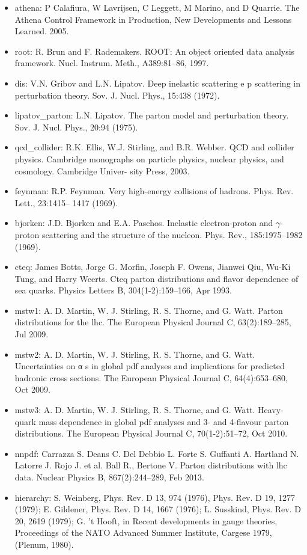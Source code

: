 \begin{itemize}
	\item athena: P Calafiura, W Lavrijsen, C Leggett, M Marino, and D Quarrie. The Athena 	Control Framework in Production, New Developments and Lessons Learned. 	2005.
	\item root: R. Brun and F. Rademakers. ROOT: An object oriented data analysis framework. Nucl. Instrum. Meth., A389:81–86, 1997.
	\item dis: V.N. Gribov and L.N. Lipatov. Deep inelastic scattering e p scattering in perturbation theory. Sov. J. Nucl. Phys., 15:438 (1972).
	\item lipatov\_parton: L.N. Lipatov. The parton model and perturbation theory. Sov. J. Nucl. Phys., 20:94
	(1975).
	\item qcd\_collider: R.K. Ellis, W.J. Stirling, and B.R. Webber. QCD and collider physics. Cambridge
	monographs on particle physics, nuclear physics, and cosmology. Cambridge Univer-
	sity Press, 2003.
	\item feynman: R.P. Feynman. Very high-energy collisions of hadrons. Phys. Rev. Lett., 23:1415–
	1417 (1969).
	\item bjorken: J.D. Bjorken and E.A. Paschos. Inelastic electron-proton and $\gamma$-proton scattering
	and the structure of the nucleon. Phys. Rev., 185:1975–1982 (1969).
	\item cteq: James Botts, Jorge G. Morfin, Joseph F. Owens, Jianwei Qiu, Wu-Ki Tung,
	and Harry Weerts. Cteq parton distributions and flavor dependence of sea
	quarks. Physics Letters B, 304(1-2):159–166, Apr 1993.
	\item mstw1: A. D. Martin, W. J. Stirling, R. S. Thorne, and G. Watt. Parton distributions
	for the lhc. The European Physical Journal C, 63(2):189–285, Jul 2009.
	\item mstw2: A. D. Martin, W. J. Stirling, R. S. Thorne, and G. Watt. Uncertainties on α s
	in global pdf analyses and implications for predicted hadronic cross sections.
	The European Physical Journal C, 64(4):653–680, Oct 2009.
	\item mstw3: A. D. Martin, W. J. Stirling, R. S. Thorne, and G. Watt. Heavy-quark mass
	dependence in global pdf analyses and 3- and 4-flavour parton distributions.
	The European Physical Journal C, 70(1-2):51–72, Oct 2010.
	\item nnpdf:  Carrazza S. Deans C. Del Debbio L. Forte S. Guffanti A. Hartland N. Latorre
	J. Rojo J. et al. Ball R., Bertone V. Parton distributions with lhc data. Nuclear
	Physics B, 867(2):244–289, Feb 2013.
	\item hierarchy:  S. Weinberg, Phys. Rev. D 13, 974 (1976), Phys. Rev. D 19, 1277 (1979); E. Gildener, Phys. Rev. D 14, 1667 (1976); L. Susskind, Phys. Rev. D 20, 2619 (1979); G. ’t Hooft, in Recent developments in gauge theories, Proceedings of the NATO Advanced Summer Institute, Cargese 1979, (Plenum, 1980).

\end{itemize}
